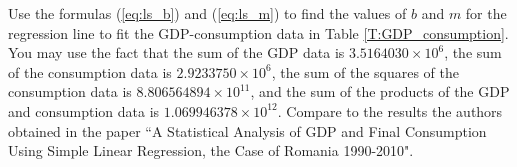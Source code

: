 \begin{pactivity}
\ea

\end{pactivity}
 
\begin{pactivity} Use the formulas (\ref{eq:ls_b}) and (\ref{eq:ls_m}) to find the values of $b$ and $m$ for the regression line to fit the GDP-consumption data in Table \ref{T:GDP_consumption}. You may use the fact that the sum of the GDP data is $3.5164030 \times 10^6$, the sum of the consumption data is $2.9233750 \times 10^6$, the sum of the squares of the consumption data is $8.806564894 \times 10^{11}$, and the sum of the products of the GDP and consumption data is $1.069946378 \times 10^{12}$. Compare to the results the authors obtained in the paper  ``A Statistical Analysis of GDP and Final Consumption Using Simple Linear Regression, the Case of Romania 1990-2010". 



\end{pactivity}



